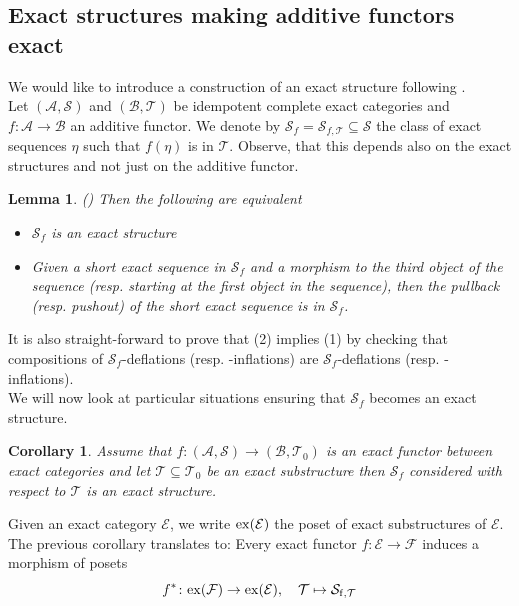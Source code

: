 \documentclass[11pt,a4paper]{amsart}
\theoremstyle{plain}
\newtheorem{lem}[thm]{Lemma}
\newtheorem{cor}[thm]{Corollary}
\theoremstyle{definition}
\newcommand{\mcA}{\mathcal{A}}
\newcommand{\mcB}{\mathcal{B}}
\newcommand{\mcE}{\mathcal{E}}
\newcommand{\mcF}{\mathcal{F}}
\newcommand{\mcS}{\mathcal{S}}
\newcommand{\mcT}{\mathcal{T}}
\begin{document}
\subsection{Exact structures making additive functors exact}



We would like to introduce a construction of an exact structure following \cite{DRSS}.\\
\noindent
Let $(\mcA, \mcS)$ and $(\mcB, \mcT)$ be idempotent complete exact categories and $f\colon \mcA\to \mcB$ an additive functor. We denote by $\mcS_f=\mcS_{f, \mcT}\subseteq \mcS$ the class of exact sequences $\eta$ such that $f(\eta)$ is in $\mcT$. Observe, that this depends also on the exact structures and not just on the additive functor. 

\begin{lem} (\cite[Lem.1.9, Prop.1.10]{DRSS})
Then the following are equivalent
\begin{itemize}
    \item[(1)] $\mcS_f$ is an exact structure
    \item[(2)] Given a short exact sequence in $\mcS_f$ and a morphism to the third object of the sequence (resp. starting at the first object in the sequence), then the pullback (resp. pushout) of the short exact sequence is in $\mcS_f$.  
\end{itemize}
\end{lem}
It is also straight-forward to prove that (2) implies (1) by checking that compositions of $\mcS_f$-deflations (resp. -inflations) are $\mcS_f$-deflations (resp. -inflations).\\
We will now look at particular situations ensuring that $\mcS_f$ becomes an exact structure. 

\begin{cor} \label{split}
Assume that $f\colon (\mcA, \mcS)\to (\mcB, \mcT_0)$ is an exact functor between exact categories and let  $\mcT\subseteq \mcT_0$ be an exact substructure then $\mcS_f$ considered with respect to $\mcT$ is an 
 exact structure. 
\end{cor}
Given an exact category $\mcE$, we write $\rm{ex} (\mcE)$ the poset of exact substructures of $\mcE$. 
The previous corollary translates to: Every exact functor $f\colon \mcE\to \mcF$ induces a morphism of posets 
\[
f^* \colon \rm{ex} (\mcF) \to \rm{ex} (\mcE) , \quad \mcT \mapsto \mcS_{f, \mcT}
\]
\end{document}
